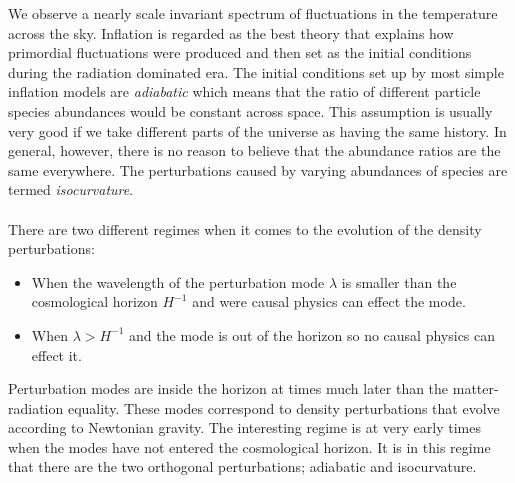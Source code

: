 \documentclass[aps,showpacs,twocolumn,floats,prd,superscriptaddress,nofootinbib]{revtex4-1}
\begin{document}
We observe a nearly scale invariant spectrum of fluctuations in the temperature across the sky. Inflation is regarded as the best theory that explains how primordial fluctuations were produced and then set as the initial conditions during the radiation dominated era. The initial conditions set up by most simple inflation models are \emph{adiabatic} which means that the ratio of different particle species abundances would be constant across space. This assumption is usually very good if we take different parts of the universe as having the same history. In general, however, there is no reason to believe that the abundance ratios are the same everywhere. The perturbations caused by varying abundances of species are termed \emph{isocurvature}. 
\\
\\
There are two different regimes when it comes to the evolution of the density perturbations: 

\begin{itemize}

\item When the wavelength of the perturbation mode $\lambda$ is smaller than the cosmological horizon $H^{-1}$ and were causal physics can effect the mode.

\item When $\lambda> H^{-1}$ and the mode is out of the horizon so no causal physics can effect it.

\end{itemize}

Perturbation modes are inside the horizon at times much later than the matter-radiation equality. These modes correspond to density perturbations that evolve according to Newtonian gravity. The interesting regime is at very early times when the modes have not entered the cosmological horizon. It is in this regime that there are the two orthogonal perturbations; adiabatic and isocurvature. 
%
%
%
%
%
%
%
%
%
\end{document}
